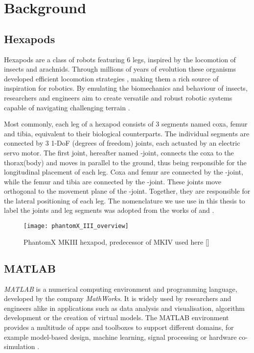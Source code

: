 \chapter{Background}
\label{ch:background}

\section[sec: Hexapods]{Hexapods}
Hexapods are a class of robots featuring 6 legs, inspired by the locomotion of insects and arachnids.
Through millions of years of evolution these organisms developed efficient locomotion strategies \parencite{neville2006bipedal}, making them a rich source of inspiration for robotics.
By emulating the biomechanics and behaviour of insects, researchers and engineers aim to create versatile and robust robotic systems capable of navigating challenging terrain \parencite{irawan2011optimal, ouyang2021adaptive, schilling2013walknet}.

Most commonly, each leg of a hexapod consists of 3 segments named coxa, femur and tibia, equivalent to their biological counterparts.
The individual segments are connected by 3 1-DoF (degrees of freedom) joints, each actuated by an electric servo motor.
The first joint, hereafter named \textalpha-joint, connects the coxa to the thorax(body) and moves in parallel to the ground, thus being responsible for the longitudinal placement of each leg.
Coxa and femur are connected by the \textbeta-joint, while the femur and tibia are connected by the \textgamma-joint. 
These joints move orthogonal to the movement plane of the \textalpha-joint. Together, they are responsible for the lateral positioning of each leg.
The nomenclature we use use in this thesis to label the joints and leg segments was adopted from the works of \cite{schilling2013walknet} and \cite{HeterarchicalArchitectureSchilling}.
\begin{figure}[h]
	\centerline{\texttt{[image: phantomX\_III\_overview]}}
	\caption{PhantomX MKIII hexapod, predecessor of MKIV used here [\cite{PhantomX_MKIII}]}
	\label{figure: PhantomX MKIII}
\end{figure}




\section{MATLAB}
\textit{MATLAB\textsuperscript{\textregistered}} is a numerical computing environment and programming language, developed by the company \textit{MathWorks\textsuperscript{\textregistered}}.
It is widely used by researchers and engineers alike in applications such as data analysis and visualisation, algorithm development or the creation of virtual models.
The MATLAB environment provides a multitude of apps and toolboxes to support different domains, for example model-based design, machine learning, signal processing or hardware co-simulation \parencite{MATLAB}.

